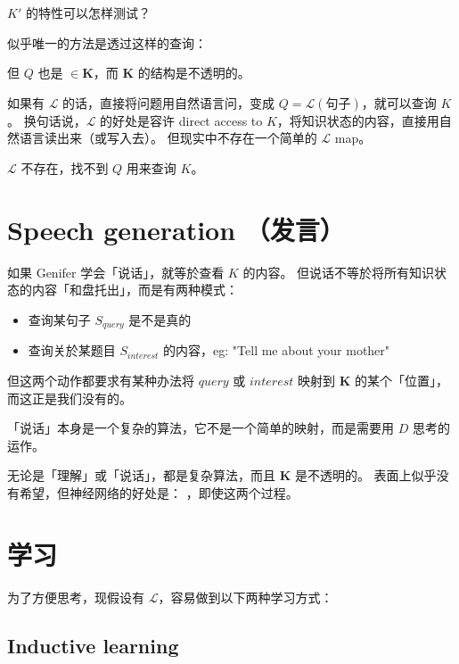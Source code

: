\documentclass[12pt]{article}
\begin{document}
$K'$ 的特性可以怎样测试？

似乎唯一的方法是透过这样的查询：
\begin{center}
\end{center}
但 $Q$ 也是 $\in \mathbf{K}$，而 $\mathbf{K}$ 的结构是不透明的。

如果有 $\mathcal{L}$ 的话，直接将问题用自然语言问，变成 $Q = \mathcal{L}(\mbox{句子})$，就可以查询 $K$。 换句话说，$\mathcal{L}$ 的好处是容许 direct access to $K$，将知识状态的内容，直接用自然语言读出来（或写入去）。 但现实中不存在一个简单的 $\mathcal{L}$ map。

$\mathcal{L}$ 不存在，找不到 $Q$ 用来查询 $K$。 

\section{Speech generation （发言）}

如果 Genifer 学会「说话」，就等於查看 $K$ 的内容。 但说话不等於将所有知识状态的内容「和盘托出」，而是有两种模式：
\begin{itemize}
\item 查询某句子 $S_{query}$ 是不是真的
\item 查询关於某题目 $S_{interest}$ 的内容，eg: "Tell me about your mother"
\end{itemize}
但这两个动作都要求有某种办法将 $query$ 或 $interest$ 映射到 $\mathbf{K}$ 的某个「位置」，而这正是我们没有的。

「说话」本身是一个复杂的算法，它不是一个简单的映射，而是需要用 $D$ 思考的运作。

无论是「理解」或「说话」，都是复杂算法，而且 $\mathbf{K}$ 是不透明的。  表面上似乎没有希望，但神经网络的好处是： ，即使这两个过程。

\section{学习}

为了方便思考，现假设有 $\mathcal{L}$，容易做到以下两种学习方式：

\subsection{Inductive learning}
\end{document}
